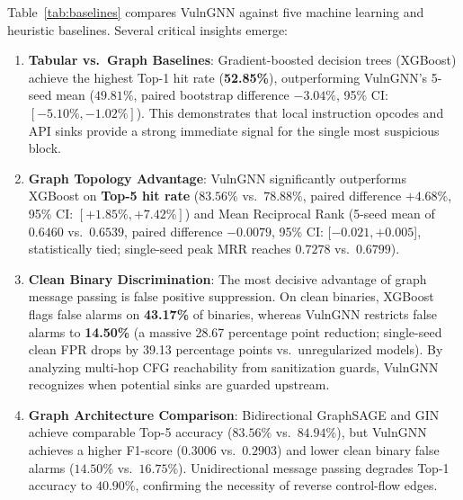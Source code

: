 \documentclass[10pt,conference]{IEEEtran}
\begin{document}
Table~\ref{tab:baselines} compares VulnGNN against five machine learning and heuristic baselines. Several critical insights emerge:
\begin{enumerate}
  \item \textbf{Tabular vs.\ Graph Baselines}: Gradient-boosted decision trees (XGBoost) achieve the highest Top-1 hit rate (\textbf{52.85\%}), outperforming VulnGNN's 5-seed mean ($49.81\%$, paired bootstrap difference $-3.04\%$, 95\% CI: $[-5.10\%, -1.02\%]$). This demonstrates that local instruction opcodes and API sinks provide a strong immediate signal for the single most suspicious block.
  \item \textbf{Graph Topology Advantage}: VulnGNN significantly outperforms XGBoost on \textbf{Top-5 hit rate} ($83.56\%$ vs.\ $78.88\%$, paired difference $+4.68\%$, 95\% CI: $[+1.85\%, +7.42\%]$) and Mean Reciprocal Rank (5-seed mean of $0.6460$ vs.\ $0.6539$, paired difference $-0.0079$, 95\% CI: [$-0.021, +0.005$], statistically tied; single-seed peak MRR reaches $0.7278$ vs.\ $0.6799$).
  \item \textbf{Clean Binary Discrimination}: The most decisive advantage of graph message passing is false positive suppression. On clean binaries, XGBoost flags false alarms on \textbf{43.17\%} of binaries, whereas VulnGNN restricts false alarms to \textbf{14.50\%} (a massive 28.67 percentage point reduction; single-seed clean FPR drops by 39.13 percentage points vs.\ unregularized models). By analyzing multi-hop CFG reachability from sanitization guards, VulnGNN recognizes when potential sinks are guarded upstream.
  \item \textbf{Graph Architecture Comparison}: Bidirectional GraphSAGE and GIN~\cite{xu2018gin} achieve comparable Top-5 accuracy ($83.56\%$ vs.\ $84.94\%$), but VulnGNN achieves a higher F1-score ($0.3006$ vs.\ $0.2903$) and lower clean binary false alarms ($14.50\%$ vs.\ $16.75\%$). Unidirectional message passing degrades Top-1 accuracy to $40.90\%$, confirming the necessity of reverse control-flow edges.
\end{enumerate}
\end{document}
